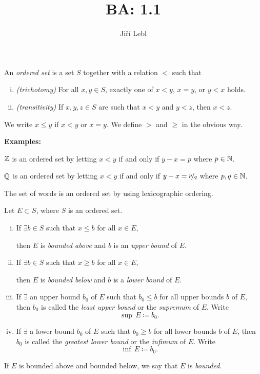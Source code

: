 \documentclass[10pt,aspectratio=169]{beamer}
\author{Ji\v{r}\'i Lebl}
\institute[OSU]{%
Departemento pri Matematiko de Oklahoma {\^S}tata Universitato}
\title{BA: 1.1}
\date{}
\begin{document}
\begin{frame}
\titlepage
\end{frame}

\begin{frame}
\begin{definition}
An \emph{ordered set} is a set $S$ together with
a relation $<$ such that
\pause
\begin{enumerate}[(i)]
\item \emph{(trichotomy)} For all $x, y \in S$, exactly one of
$x < y$, $x=y$, or $y < x$ holds.
\pause
\item \emph{(transitivity)} If $x,y,z \in S$ are such that $x < y$ and $y
< z$, then $x < z$.
\end{enumerate}
\pause
We write $x \leq y$ if $x < y$ or $x=y$.  We define
$>$ and $\geq$ in the obvious way.
\end{definition}
\pause

\textbf{Examples:}

\medskip

${\mathbb{Z}}$ is an ordered set by letting $x < y$ if and only if $y-x = p$ where $p \in {\mathbb{N}}$.

\medskip
\pause

${\mathbb{Q}}$ is an ordered set by letting $x < y$ if and only if $y-x = \nicefrac{p}{q}$ where $p,q \in {\mathbb{N}}$.

\medskip
\pause

The set of words is an ordered set by using lexicographic ordering.

\end{frame}

\begin{frame}

\begin{definition}
Let $E \subset S$, where $S$ is an ordered set.
\pause
\begin{enumerate}[(i)]
\item If $\exists b \in S$ such that $x \leq b$ for all $x \in E$,

then $E$ is \emph{bounded above} and $b$
is an \emph{upper bound} of $E$.
\pause
\item If $\exists b \in S$ such that $x \geq b$ for all $x \in E$,

then $E$ is \emph{bounded below} and $b$
is a \emph{lower bound} of $E$.
\pause
\item 
If $\exists$ an upper bound $b_0$ of $E$ such that
$b_0 \leq b$ for all upper bounds $b$ of $E$, then
$b_0$ is called the \emph{least upper bound} or
the \emph{supremum} of $E$.
Write
\[
\sup\, E \coloneqq b_0  .
\]
\item
\pause
If $\exists$ a lower bound $b_0$ of $E$ such that
$b_0 \geq b$ for all lower bounds $b$ of $E$, then
$b_0$ is called the \emph{greatest lower bound} or
the \emph{infimum} of $E$.
Write
\[
\inf\, E \coloneqq b_0  .
\]
\end{enumerate}
\pause
If $E$ is bounded above and bounded below, we say that
$E$ is \emph{bounded}.
\end{definition}
\end{frame}
\end{document}
